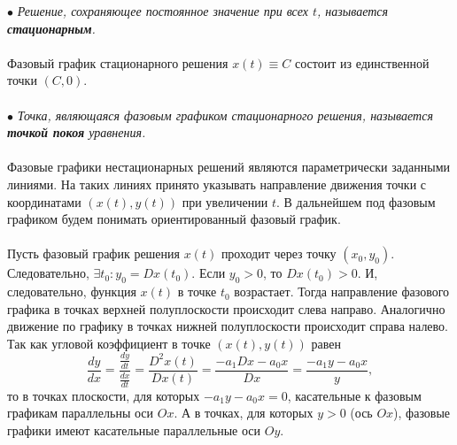 \documentclass[a4paper, 12pt]{report}
\begin{document}
$\bullet$ \textit{Решение, сохраняющее постоянное значение при всех $t$, называется \textbf{стационарным}.}\\\\
Фазовый график стационарного решения $x(t)\equiv C$ состоит из единственной точки $(C, 0)$.\\\\
$\bullet$ \textit{Точка, являющаяся фазовым графиком стационарного решения, называется \textbf{точкой покоя} уравнения.}\\\\
Фазовые графики нестационарных решений являются параметрически заданными линиями. На таких линиях принято указывать направление движения точки с координатами $(x(t), y(t))$ при увеличении $t$. В дальнейшем под фазовым графиком будем понимать ориентированный фазовый график.\\\\
Пусть фазовый график решения $x(t)$ проходит через точку $(x_0, y_0)$. Следовательно, $\exists t_0 : y_0 = Dx(t_0)$. Если $y_0 > 0$, то $Dx(t_0) > 0$. И, следовательно, функция $x(t)$ в точке $t_0$ возрастает. Тогда направление фазового графика в точках верхней полуплоскости происходит слева направо. Аналогично движение по графику в точках нижней полуплоскости происходит справа налево. Так как угловой коэффициент в точке $(x(t), y(t))$ равен $$\dfrac{dy}{dx} = \dfrac{\frac{dy}{dt}}{\frac{dx}{dt}} = \dfrac{D^2x(t)}{Dx(t)} = \dfrac{-a_1Dx - a_0x}{Dx} = \dfrac{-a_1y-a_0x}{y},$$ то в точках плоскости, для которых $-a_1y-a_0x = 0$, касательные к фазовым графикам параллельны оси $Ox$. А в точках, для которых $y > 0$ (ось $Ox$), фазовые графики имеют касательные параллельные оси $Oy$.
\end{document}
